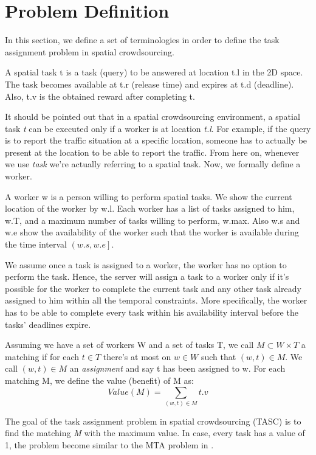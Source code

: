 \section{Problem Definition}

In this section, we define a set of terminologies in order to define the task assignment problem in spatial crowdsourcing.

\begin{definition} 
A spatial task t is a task (query) to be answered at location t.l in the 2D space. The task becomes available at t.r (release time) and expires at t.d (deadline). Also, t.v is the obtained reward after completing t.
\end{definition}

It should be pointed out that in a spatial crowdsourcing environment, a spatial task \emph{t} can be executed only if a worker is at location \emph{t.l}. For example, if the query is to report the traffic situation at a specific location, someone has to actually be present at the location to be able to report the traffic. From here on, whenever we use \emph{task} we're actually referring to a spatial task. Now, we formally define a worker.

\begin{definition} [Worker]
A worker w is a person willing to perform spatial tasks. We show the current location of the worker by w.l. Each worker has a list of tasks assigned to him, w.T, and a maximum number of tasks willing to perform, w.max. Also w.s and w.e show the availability of the worker such that the worker is available during the time interval $\left( w.s, w.e \right]$.
\end{definition}

We assume once a task is assigned to a worker, the worker has no option to perform the task. Hence, the server will assign a task to a worker only if it's possible for the worker to complete the current task and any other task already assigned to him within all the temporal constraints. More specifically, the worker has to be able to complete every task within his availability interval before the tasks' deadlines expire.

\begin{definition} [Matching]
Assuming we have a set of workers W and a set of tasks T, we call $M \subset W \times T$ a matching if for each $t \in T$ there's at most on $w \in W$ such that $\left( w, t \right) \in M$. We call $\left( w, t \right) \in M$ an \emph{assignment} and say t has been assigned to w. For each matching M, we define the value (benefit) of M as:
\begin{equation*}
Value(M) = \sum_{\left( w, t \right) \in M} t.v
\end{equation*}
\end{definition}

The goal of the task assignment problem in spatial crowdsourcing (TASC) is to find the matching \emph{M} with the maximum value. In case, every task has a value of 1, the problem become similar to the MTA problem in \cite{kazemi12}.